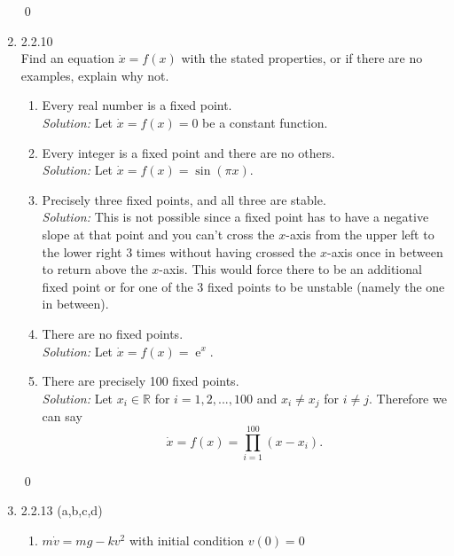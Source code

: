\documentclass[10pt]{amsart}
\DeclareMathOperator{\E}{e}
\theoremstyle{nonumberplain}
\begin{document}
\begin{enumerate}[label={\bf {\arabic*}:}]
\qed \\

\newpage

\item 2.2.10 \\
Find an equation $\dot x = f(x)$ with the stated properties, or if there are no examples, explain why not. \\

\noindent
\begin{enumerate}
\item Every real number is a fixed point. \\
\textit{Solution:} Let $\dot x = f(x) = 0$ be a constant function. \\

\item Every integer is a fixed point and there are no others. \\
\textit{Solution:} Let $\dot x = f(x) = \sin(\pi x)$. \\

\item Precisely three fixed points, and all three are stable. \\
\textit{Solution:} This is not possible since a fixed point has to have a negative slope at that point and you can't cross the $x$-axis from the upper left to the lower right 3 times without having crossed the $x$-axis once in between to return above the $x$-axis.
This would force there to be an additional fixed point or for one of the 3 fixed points to be unstable (namely the one in between). \\

\item There are no fixed points. \\
\textit{Solution:} Let $\dot x = f(x) = \E^x$. \\

\item There are precisely 100 fixed points. \\
\textit{Solution:} Let $x_i \in \mathbb R$ for $i = 1, 2, ..., 100$ and $x_i \neq x_j$ for $i \neq j$.
Therefore we can say 
$$\dot x = f(x) = \prod_{i=1}^{100} (x - x_i).$$
\end{enumerate}

\qed \\
\newpage

\item 2.2.13 (a,b,c,d) \\
\begin{enumerate}
\item $m \dot v = mg - kv^2$ with initial condition $v(0) = 0$ \\


\end{enumerate}
\end{enumerate}
\end{document}

